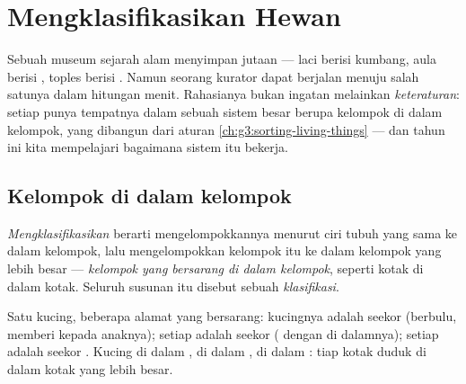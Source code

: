 \chapter{Mengklasifikasikan Hewan}\label{ch:g4:classifying-animals}

Sebuah museum sejarah alam menyimpan jutaan  --- laci berisi
kumbang, aula berisi , toples berisi . Namun seorang kurator
dapat berjalan menuju salah satunya dalam hitungan menit. Rahasianya
bukan ingatan melainkan \emph{keteraturan}: setiap  punya
tempatnya dalam sebuah sistem besar berupa kelompok di dalam kelompok,
yang dibangun dari aturan 
\cref{ch:g3:sorting-living-things} --- dan tahun ini kita mempelajari
bagaimana sistem itu bekerja.

\section{Kelompok di dalam kelompok}

\begin{definition}[Klasifikasi]\label{def:g4:classifying-animals:classification}
\emph{Mengklasifikasikan} 
berarti mengelompokkannya menurut ciri tubuh yang sama ke dalam
kelompok, lalu mengelompokkan kelompok itu ke dalam kelompok yang
lebih besar --- \emph{kelompok yang bersarang di dalam
kelompok}, seperti kotak di dalam kotak.
Seluruh susunan itu disebut sebuah
\emph{klasifikasi}.
\end{definition}

\begin{example}\label{ex:g4:classifying-animals:cat}
Satu kucing, beberapa alamat yang bersarang: kucingnya adalah seekor
\emph{} (berbulu, memberi  kepada anaknya); setiap 
adalah seekor \emph{} ( dengan  di
dalamnya); setiap  adalah seekor \emph{}. Kucing di
dalam ,  di dalam ,  di dalam :
tiap kotak duduk di dalam kotak yang lebih besar.
\end{example}

